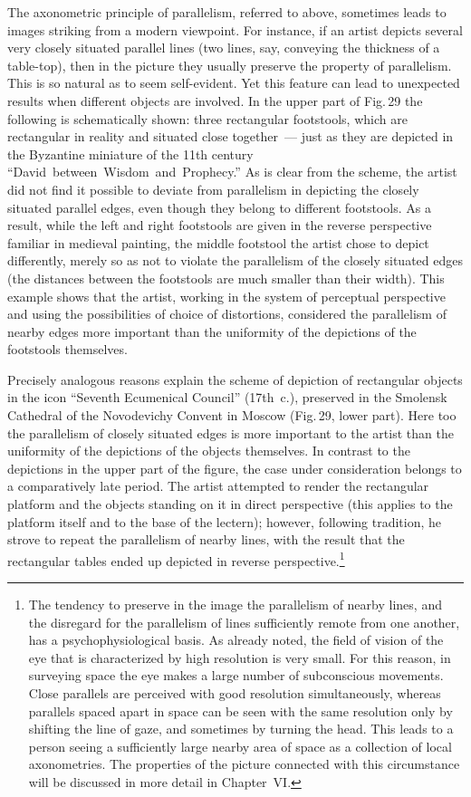 The axonometric principle of parallelism, referred to above, sometimes leads to images
striking from a modern viewpoint.  For instance, if an artist depicts several very closely
situated parallel lines (two lines, say, conveying the thickness of a table-top), then in
the picture they usually preserve the property of parallelism.  This is so natural as to
seem self-evident.  Yet this feature can lead to unexpected results when different objects
are involved.  In the upper part of Fig.\,29 the following is schematically shown: three
rectangular footstools, which are rectangular in reality and situated close together~---
just as they are depicted in the Byzantine miniature of the 11th century
``David~between~Wisdom~and~Prophecy.''  As is clear from the scheme, the artist did
not find it possible to deviate from parallelism in depicting the closely situated parallel
edges, even though they belong to different footstools.  As a result, while the left and
right footstools are given in the reverse perspective familiar in medieval painting, the
middle footstool the artist chose to depict differently, merely so as not to violate the
parallelism of the closely situated edges (the distances between the footstools are much
smaller than their width).  This example shows that the artist, working in the system of
perceptual perspective and using the possibilities of choice of distortions, considered
the parallelism of nearby edges more important than the uniformity of the depictions of
the footstools themselves.


Precisely analogous reasons explain the scheme of depiction of rectangular objects in
the icon ``Seventh Ecumenical Council'' (17th~c.), preserved in the Smolensk Cathedral
of the Novodevichy Convent in Moscow (Fig.\,29, lower part).  Here too the parallelism
of closely situated edges is more important to the artist than the uniformity of the
depictions of the objects themselves.  In contrast to the depictions in the upper part of
the figure, the case under consideration belongs to a comparatively late period.  The
artist attempted to render the rectangular platform and the objects standing on it in
direct perspective (this applies to the platform itself and to the base of the lectern);
however, following tradition, he strove to repeat the parallelism of nearby lines, with
the result that the rectangular tables ended up depicted in reverse perspective.\footnote{%
  The tendency to preserve in the image the parallelism of nearby lines, and the
  disregard for the parallelism of lines sufficiently remote from one another, has a
  psychophysiological basis.  As already noted, the field of vision of the eye that is
  characterized by high resolution is very small.  For this reason, in surveying space
  the eye makes a large number of subconscious movements.  Close parallels are
  perceived with good resolution simultaneously, whereas parallels spaced apart in
  space can be seen with the same resolution only by shifting the line of gaze, and
  sometimes by turning the head.  This leads to a person seeing a sufficiently large
  nearby area of space as a collection of local axonometries.  The properties of the
  picture connected with this circumstance will be discussed in more detail in
  Chapter~VI.}

